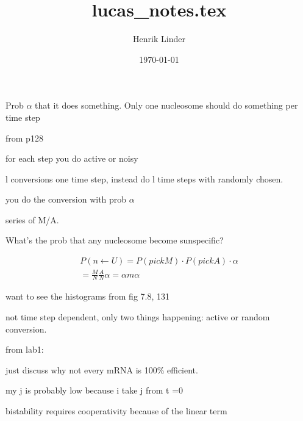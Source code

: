 \documentclass{article}
\title{lucas_notes.tex }
\author{Henrik Linder}
\date{\today}
\begin{document}
\maketitle


Prob $\alpha$ that it does something. Only one nucleosome should do something per time step 

from p128 

for each step you do active or noisy 

l conversions one time step, instead do l time steps with randomly chosen.


you do the conversion with prob $\alpha$

series of M/A. 

What's the prob that any nucleosome become sunspecific? 

\begin{equation}
	\begin{split}
	P(n\leftarrow U) = P(pick M)\cdot P(pick A) \cdot \alpha\\
	= \frac{M}{N} \frac{A}{N}\alpha = \alpha m \alpha
	\end{split}
\end{equation}

want to see the histograms from fig 7.8, 131

not time step dependent, only two things happening: active or random conversion. 



from lab1: 

just discuss why not every mRNA is 100\% efficient. 
 
my j is probably low because i take j from t =0 


bistability requires cooperativity because of the linear term
\end{document}
